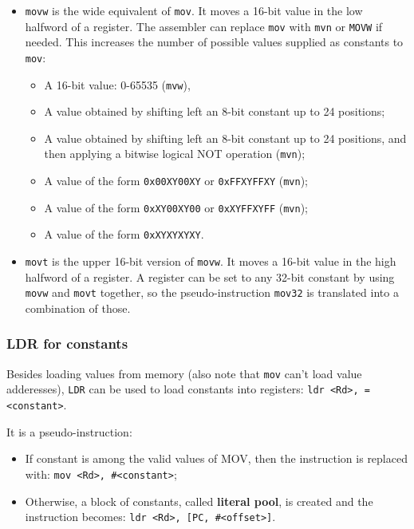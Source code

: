 \documentclass[a4paper,11pt]{article}
\begin{document}
\begin{itemize}
	\item \texttt{movw} is the wide equivalent of \texttt{mov}. It moves a 16-bit value in the low halfword of a register. The assembler can replace \texttt{mov} with \texttt{mvn} or \texttt{MOVW} if needed. This increases the number of possible values supplied as constants to \texttt{mov}:
	      \begin{itemize}
		      \item A 16-bit value: 0-65535 (\texttt{mvw}),
		      \item A value obtained by shifting left an 8-bit constant up to 24 positions;
		      \item A value obtained by shifting left an 8-bit constant up to 24 positions, and then applying a bitwise logical NOT operation (\texttt{mvn});
		      \item A value of the form \texttt{0x00XY00XY} or \texttt{0xFFXYFFXY} (\texttt{mvn});
		      \item A value of the form \texttt{0xXY00XY00} or \texttt{0xXYFFXYFF} (\texttt{mvn});
		      \item A value of the form \texttt{0xXYXYXYXY}.
	      \end{itemize}

	\item \texttt{movt} is the upper 16-bit version of \texttt{movw}. It moves a 16-bit value in the high halfword of a register. A register can be set to any 32-bit constant by using \texttt{movw} and \texttt{movt} together, so the pseudo-instruction \texttt{mov32} is translated into a combination of those.

\end{itemize}

\subsubsection{LDR for constants}

Besides loading values from memory (also note that \texttt{mov} can't load value adderesses), \texttt{LDR} can be used to load constants into registers: \texttt{ldr <Rd>, =<constant>}.

It is a pseudo-instruction:
\begin{itemize}
	\item
	      If constant is among the valid values of MOV, then the instruction is replaced with: \texttt{mov <Rd>, \#<constant>};
	\item
	      Otherwise, a block of constants, called \textbf{literal pool}, is created and the instruction becomes: \texttt{ldr <Rd>, [PC, \#<offset>]}.
\end{itemize}
\end{document}
